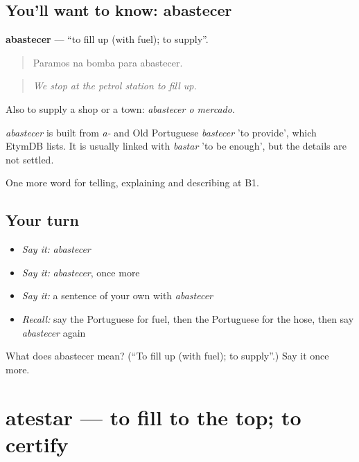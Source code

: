 \subsection*{You'll want to know: abastecer}
\textbf{abastecer} — \textquotedblleft{}to fill up (with fuel); to supply\textquotedblright{}.

\begin{quote}
Paramos na bomba para abastecer.
\end{quote}

\begin{quote}
\emph{We stop at the petrol station to fill up.}
\end{quote}

Also to supply a shop or a town: \emph{abastecer o mercado}.

\begin{cousinweb}
\emph{abastecer} is built from \emph{a-} and Old Portuguese \emph{bastecer} 'to provide', which EtymDB lists. It is usually linked with \emph{bastar} 'to be enough', but the details are not settled.
\end{cousinweb}

\begin{grammarlens}[title={What you've built}]
One more word for telling, explaining and describing at B1.
\end{grammarlens}

\subsection*{Your turn}
\begin{itemize}
\raggedright
  \item \emph{Say it:} \emph{abastecer}
  \item \emph{Say it:} \emph{abastecer}, once more
  \item \emph{Say it:} a sentence of your own with \emph{abastecer}
  \item \emph{Recall:} say the Portuguese for fuel, then the Portuguese for the hose, then say \emph{abastecer} again
\end{itemize}

\begin{tcolorbox}[breakable,colback=teal!4,colframe=teal!35!black,title={Before you move on}]
What does abastecer mean? (\textquotedblleft{}To fill up (with fuel); to supply\textquotedblright{}.) Say it once more.
\end{tcolorbox}
\section[atestar]{atestar — to fill to the top; to certify}

